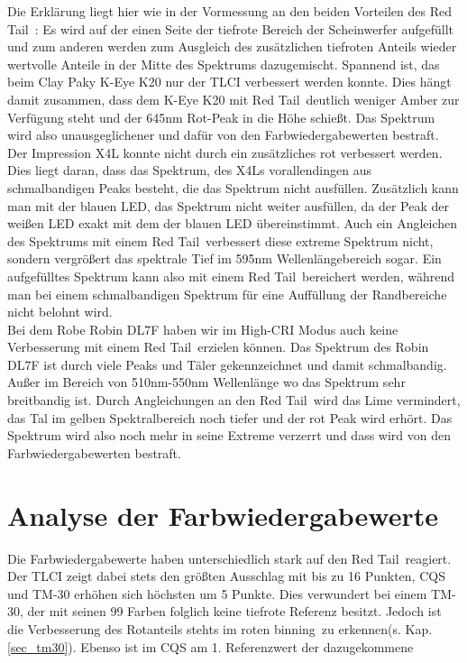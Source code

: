 Die Erklärung liegt hier wie in der Vormessung an den beiden Vorteilen des \glqq Red Tail\grqq\ : Es wird auf der einen Seite der tiefrote Bereich der Scheinwerfer aufgefüllt und zum anderen werden zum Ausgleich des zusätzlichen tiefroten Anteils wieder wertvolle Anteile in der Mitte des Spektrums dazugemischt. Spannend ist, das beim Clay Paky K-Eye K20 nur der TLCI verbessert werden konnte. Dies hängt damit zusammen, dass dem K-Eye K20 mit \glqq Red Tail\grqq\ deutlich weniger Amber zur Verfügung steht und der 645nm Rot-Peak in die Höhe schießt. Das Spektrum wird also unausgeglichener und dafür von den Farbwiedergabewerten bestraft.\\
Der Impression X4L konnte nicht durch ein zusätzliches rot verbessert werden. Dies liegt daran, dass das Spektrum, des X4Ls vorallendingen aus schmalbandigen Peaks besteht, die das Spektrum nicht ausfüllen. Zusätzlich kann man mit der blauen LED, das Spektrum nicht weiter ausfüllen, da der Peak der weißen LED exakt mit dem der blauen LED übereinstimmt. Auch ein Angleichen des Spektrums mit einem \glqq Red Tail\grqq\ verbessert diese extreme Spektrum nicht, sondern vergrößert das spektrale Tief im 595nm Wellenlängebereich sogar. Ein aufgefülltes Spektrum kann also mit einem \glqq Red Tail\grqq\ bereichert werden, während man bei einem schmalbandigen Spektrum für eine Auffüllung der Randbereiche nicht belohnt wird.\\
Bei dem Robe Robin DL7F haben wir im High-CRI Modus auch keine Verbesserung mit einem \glqq Red Tail\grqq\ erzielen können. Das Spektrum des Robin DL7F ist durch viele Peaks und Täler gekennzeichnet und damit schmalbandig. Außer im Bereich von 510nm-550nm Wellenlänge wo das Spektrum sehr breitbandig ist. Durch Angleichungen an den \glqq Red Tail\grqq\ wird das Lime vermindert, das Tal im gelben Spektralbereich noch tiefer und der rot Peak wird erhört. Das Spektrum wird also noch mehr in seine Extreme verzerrt und dass wird von den Farbwiedergabewerten bestraft.

\section{Analyse der Farbwiedergabewerte}
\label{sec_analfww}
Die Farbwiedergabewerte haben unterschiedlich stark auf den \glqq Red Tail\grqq\ reagiert. Der TLCI zeigt dabei stets den größten Ausschlag mit bis zu 16 Punkten, CQS und TM-30 erhöhen sich höchsten um 5 Punkte. Dies verwundert bei einem TM-30, der mit seinen 99 Farben folglich keine tiefrote Referenz besitzt. Jedoch ist die Verbesserung des Rotanteils stehts im roten \glqq binning\grqq\ zu erkennen(s. Kap. \ref{sec_tm30}). Ebenso ist im CQS am 1. Referenzwert der dazugekommene  


